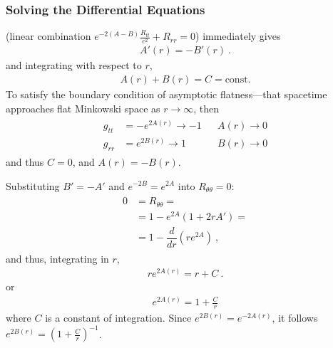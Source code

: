 \documentclass[letterpaper,10pt,english]{jupyterBook}
\begin{document}
\subsubsection{Solving the Differential Equations}
\label{\detokenize{ch/relativity-general/schwarzschild-metric:solving-the-differential-equations}}
\sphinxAtStartPar
{} (linear combination \(e^{-2(A-B)} \frac{R_{tt}}{c^2} + R_{rr} = 0\)) immediately gives
\begin{equation*}
\begin{split}A'(r) = -B'(r) \ .\end{split}
\end{equation*}
\sphinxAtStartPar
and integrating with respect to \(r\),
\begin{equation*}
\begin{split}A(r) + B(r) = C = \text{const.}\end{split}
\end{equation*}
\sphinxAtStartPar
{} To satisfy the boundary condition of asymptotic flatness—that spacetime approaches flat Minkowski space as \(r \rightarrow \infty\), then
\begin{equation*}
\begin{split}\begin{aligned}
  g_{tt} & = - e^{2A(r)} \rightarrow - 1 && A(r) \rightarrow 0 \\
  g_{rr} & =   e^{2B(r)} \rightarrow   1 && B(r) \rightarrow 0
\end{aligned}\end{split}
\end{equation*}
\sphinxAtStartPar
and thus \(C = 0\), and \(A(r) = - B(r)\).

\sphinxAtStartPar
{} Substituting \(B' = -A'\) and \(e^{-2B} = e^{2A}\) into \(R_{\theta \theta} = 0\):
\begin{equation*}
\begin{split}\begin{aligned}
  0 
  & = R_{\theta \theta} = \\
  & = 1 - e^{2A} \left( 1 + 2rA' \right) = \\
  & = 1 - \dfrac{d}{dr} \left( r e^{2 A} \right)  \ ,
\end{aligned}\end{split}
\end{equation*}
\sphinxAtStartPar
and thus, integrating in \(r\),
\begin{equation*}
\begin{split}r e^{2 A(r)} = r + C \ .\end{split}
\end{equation*}
\sphinxAtStartPar
or
\begin{equation*}
\begin{split}e^{2A(r)} = 1 + \frac{C}{r}\end{split}
\end{equation*}
\sphinxAtStartPar
where \(C\) is a constant of integration. Since \(e^{2B(r)} = e^{-2A(r)}\), it follows \(e^{2B(r)} = \left(1 + \frac{C}{r} \right)^{-1}\).
\end{document}
